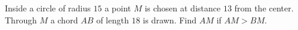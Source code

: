 Inside a circle of radius $15$ a point $M$ is chosen at distance $13$ from the center. Through $M$ a chord $AB$ of length $18$ is drawn. Find $AM$ if $AM>BM$.

